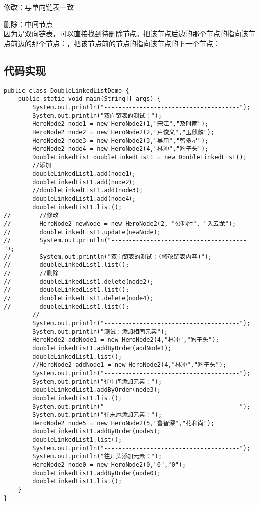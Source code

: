 \documentclass[a4paper]{report}
\begin{document}
修改：与单向链表一致

删除：中间节点
\\
因为是双向链表，可以直接找到待删除节点。把该节点后边的那个节点的指向该节点前边的那个节点：，把该节点前的节点的指向该节点的下一个节点：
\subsection{代码实现}

\begin{lstlisting}
public class DoubleLinkedListDemo {
    public static void main(String[] args) {
        System.out.println("--------------------------------------");
        System.out.println("双向链表的测试：");
        HeroNode2 node1 = new HeroNode2(1,"宋江","及时雨");
        HeroNode2 node2 = new HeroNode2(2,"卢俊义","玉麒麟");
        HeroNode2 node3 = new HeroNode2(3,"吴用","智多星");
        HeroNode2 node4 = new HeroNode2(4,"林冲","豹子头");
        DoubleLinkedList doubleLinkedList1 = new DoubleLinkedList();
        //添加
        doubleLinkedList1.add(node1);
        doubleLinkedList1.add(node2);
        //doubleLinkedList1.add(node3);
        doubleLinkedList1.add(node4);
        doubleLinkedList1.list();
//        //修改
//        HeroNode2 newNode = new HeroNode2(2, "公孙胜", "入云龙");
//        doubleLinkedList1.update(newNode);
//        System.out.println("--------------------------------------");
//        System.out.println("双向链表的测试：(修改链表内容)");
//        doubleLinkedList1.list();
//        //删除
//        doubleLinkedList1.delete(node2);
//        doubleLinkedList1.list();
//        doubleLinkedList1.delete(node4);
//        doubleLinkedList1.list();
        //
        System.out.println("--------------------------------------");
        System.out.println("测试：添加相同元素");
        HeroNode2 addNode1 = new HeroNode2(4,"林冲","豹子头");
        doubleLinkedList1.addByOrder(addNode1);
        doubleLinkedList1.list();
        //HeroNode2 addNode1 = new HeroNode2(4,"林冲","豹子头");
        System.out.println("--------------------------------------");
        System.out.println("往中间添加元素：");
        doubleLinkedList1.addByOrder(node3);
        doubleLinkedList1.list();
        System.out.println("--------------------------------------");
        System.out.println("往末尾添加元素：");
        HeroNode2 node5 = new HeroNode2(5,"鲁智深","花和尚");
        doubleLinkedList1.addByOrder(node5);
        doubleLinkedList1.list();
        System.out.println("--------------------------------------");
        System.out.println("往开头添加元素：");
        HeroNode2 node0 = new HeroNode2(0,"0","0");
        doubleLinkedList1.addByOrder(node0);
        doubleLinkedList1.list();
    }
}


\end{lstlisting}
\end{document}
